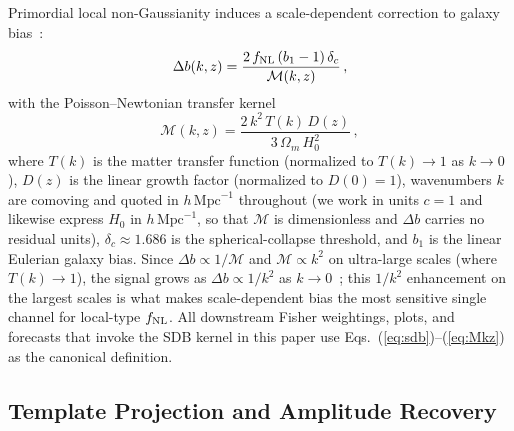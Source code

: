 \documentclass[aps,prd,twocolumn,superscriptaddress,showpacs,preprintnumbers,nofootinbib,longbibliography,floatfix]{revtex4-2}
\newcommand{\fnl}{f_{\rm NL}}
\begin{document}
Primordial local non-Gaussianity induces a scale-dependent correction to galaxy bias~\cite{Dalal:2007cu,Slosar:2008}:
\begin{equation}
\Delta b(k,z) = \frac{2\,\fnl\,(b_1 - 1)\,\delta_c}{\mathcal{M}(k,z)}\,,
\label{eq:sdb}
\end{equation}
with the Poisson--Newtonian transfer kernel
\begin{equation}
\mathcal{M}(k,z) = \frac{2\,k^2\,T(k)\,D(z)}{3\,\Omega_m\,H_0^2}\,,
\label{eq:Mkz}
\end{equation}
where $T(k)$ is the matter transfer function (normalized to $T(k)\to 1$ as $k\to 0$), $D(z)$ is the linear growth factor (normalized to $D(0)=1$), wavenumbers $k$ are comoving and quoted in $h\,\mathrm{Mpc}^{-1}$ throughout (we work in units $c=1$ and likewise express $H_0$ in $h\,\mathrm{Mpc}^{-1}$, so that $\mathcal{M}$ is dimensionless and $\Delta b$ carries no residual units), $\delta_c \approx 1.686$ is the spherical-collapse threshold, and $b_1$ is the linear Eulerian galaxy bias. Since $\Delta b \propto 1/\mathcal{M}$ and $\mathcal{M} \propto k^2$ on ultra-large scales (where $T(k)\to 1$), the signal grows as $\Delta b \propto 1/k^2$ as $k\to 0$~\cite{Dalal:2007cu,Slosar:2008}; this $1/k^2$ enhancement on the largest scales is what makes scale-dependent bias the most sensitive single channel for local-type $\fnl$. All downstream Fisher weightings, plots, and forecasts that invoke the SDB kernel in this paper use Eqs.~(\ref{eq:sdb})--(\ref{eq:Mkz}) as the canonical definition.

\subsection{Template Projection and Amplitude Recovery}
\label{sec:template}
\end{document}
